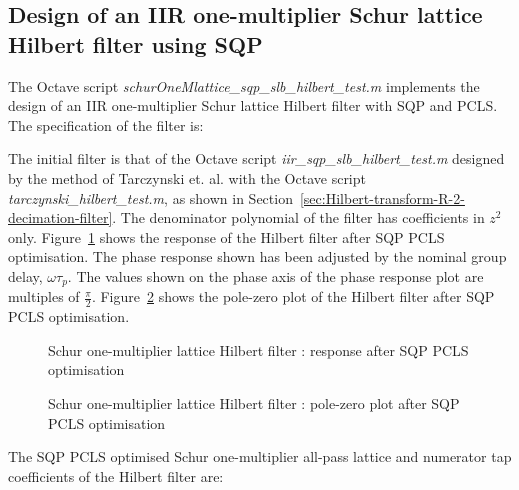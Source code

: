 \documentclass[a4paper,twoside,10pt,english]{report}
\begin{document}
\subsection{\label{sec:Design-IIR-one-multiplier-Schur-lattice-hilbert-SQP}Design of an IIR one-multiplier Schur lattice Hilbert filter using SQP}
The Octave script \emph{schurOneMlattice\_sqp\_slb\_hilbert\_test.m} implements
the design of an IIR one-multiplier Schur lattice Hilbert filter with SQP and 
PCLS. The specification of the filter is:
\begin{small}

\end{small}
The initial filter is that of the Octave script 
\emph{iir\_sqp\_slb\_hilbert\_test.m} designed by
the method of Tarczynski et. al. with the Octave script 
\emph{tarczynski\_hilbert\_test.m}, as shown in 
Section~\ref{sec:Hilbert-transform-R-2-decimation-filter}.
The denominator polynomial of the filter has coefficients in $z^{2}$ only.
Figure~\ref{fig:Schur-one-multiplier-lattice-hilbert-filter-SQP-PCLS} 
shows the response of the Hilbert filter after SQP PCLS optimisation. The phase
response shown has been adjusted by the nominal group delay, $\omega{}\tau_{p}$.
The values shown on the phase axis of the phase response plot are multiples of
$\frac{\pi}{2}$.
Figure~\ref{fig:Schur-one-multiplier-lattice-hilbert-filter-SQP-PCLS-pz} shows
the pole-zero plot of the Hilbert filter after SQP PCLS optimisation.
\begin{figure}[!htbp]
\begin{center}
\scalebox{0.7}{}
\caption{Schur one-multiplier lattice Hilbert filter : response after SQP PCLS optimisation}
\label{fig:Schur-one-multiplier-lattice-hilbert-filter-SQP-PCLS}
\end{center}
\end{figure}
\begin{figure}[!htbp]
\begin{center}
\scalebox{0.7}{}
\caption{Schur one-multiplier lattice Hilbert filter : pole-zero plot after SQP PCLS optimisation}
\label{fig:Schur-one-multiplier-lattice-hilbert-filter-SQP-PCLS-pz}
\end{center}
\end{figure}

The SQP PCLS optimised Schur one-multiplier all-pass lattice and numerator tap 
coefficients of the Hilbert filter are:
\begin{small}




\end{small}
\end{document}
